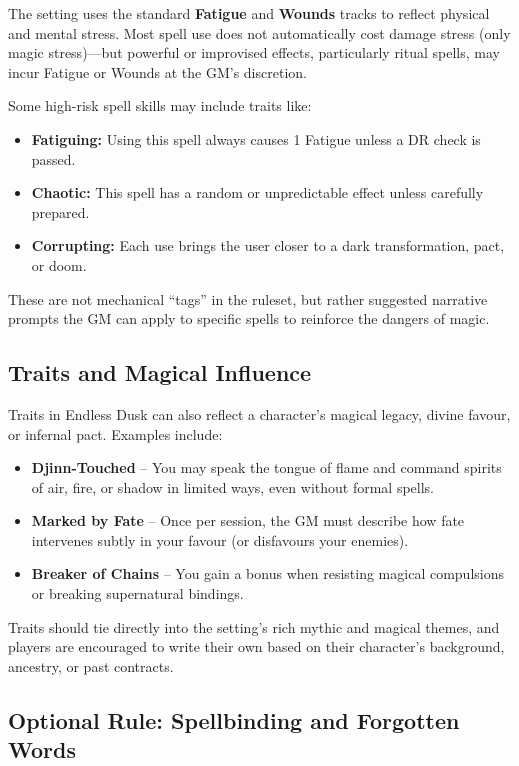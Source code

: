 The setting uses the standard \textbf{Fatigue} and \textbf{Wounds} tracks to reflect physical and mental stress. Most spell use does not automatically cost damage stress (only magic stress)—but powerful or improvised effects, particularly ritual spells, may incur Fatigue or Wounds at the GM’s discretion.

Some high-risk spell skills may include traits like:

\begin{itemize}
    \item \textbf{Fatiguing:} Using this spell always causes 1 Fatigue unless a DR check is passed.
    \item \textbf{Chaotic:} This spell has a random or unpredictable effect unless carefully prepared.
    \item \textbf{Corrupting:} Each use brings the user closer to a dark transformation, pact, or doom.
\end{itemize}

These are not mechanical “tags” in the ruleset, but rather suggested narrative prompts the GM can apply to specific spells to reinforce the dangers of magic.

\subsection{Traits and Magical Influence}

Traits in Endless Dusk can also reflect a character’s magical legacy, divine favour, or infernal pact. Examples include:

\begin{itemize}\raggedright
    \item \textbf{Djinn-Touched} – You may speak the tongue of flame and command spirits of air, fire, or shadow in limited ways, even without formal spells.
    \item \textbf{Marked by Fate} – Once per session, the GM must describe how fate intervenes subtly in your favour (or disfavours your enemies).
    \item \textbf{Breaker of Chains} – You gain a bonus when resisting magical compulsions or breaking supernatural bindings.
\end{itemize}

Traits should tie directly into the setting’s rich mythic and magical themes, and players are encouraged to write their own based on their character’s background, ancestry, or past contracts.

\subsection{Optional Rule: Spellbinding and Forgotten Words}


